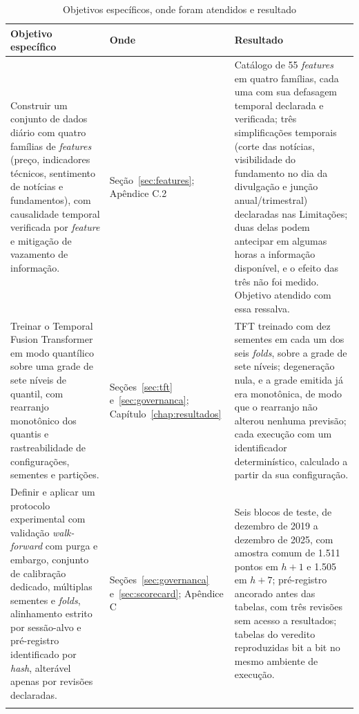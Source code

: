 \begin{table}[htbp]
\centering
\caption{Objetivos específicos, onde foram atendidos e resultado}
\label{tab:objetivos}
\footnotesize
\begin{tabular}{>{\raggedright\arraybackslash}p{5.6cm} >{\raggedright\arraybackslash}p{2.3cm} >{\raggedright\arraybackslash}p{6.4cm}}
\toprule
Objetivo específico & Onde & Resultado \\
\midrule
Construir um conjunto de dados diário com quatro famílias de \textit{features} (preço, indicadores técnicos, sentimento de notícias e fundamentos), com causalidade temporal verificada por \textit{feature} e mitigação de vazamento de informação. & Seção~\ref{sec:features}; Apêndice C.2 & Catálogo de 55 \textit{features} em quatro famílias, cada uma com sua defasagem temporal declarada e verificada; três simplificações temporais (corte das notícias, visibilidade do fundamento no dia da divulgação e junção anual/trimestral) declaradas nas Limitações; duas delas podem antecipar em algumas horas a informação disponível, e o efeito das três não foi medido. Objetivo atendido com essa ressalva. \\
\addlinespace
Treinar o Temporal Fusion Transformer em modo quantílico sobre uma grade de sete níveis de quantil, com rearranjo monotônico dos quantis e rastreabilidade de configurações, sementes e partições. & Seções~\ref{sec:tft} e~\ref{sec:governanca}; Capítulo~\ref{chap:resultados} & TFT treinado com dez sementes em cada um dos seis \textit{folds}, sobre a grade de sete níveis; degeneração nula, e a grade emitida já era monotônica, de modo que o rearranjo não alterou nenhuma previsão; cada execução com um identificador determinístico, calculado a partir da sua configuração. \\
\addlinespace
Definir e aplicar um protocolo experimental com validação \textit{walk-forward} com purga e embargo, conjunto de calibração dedicado, múltiplas sementes e \textit{folds}, alinhamento estrito por sessão-alvo e pré-registro identificado por \textit{hash}, alterável apenas por revisões declaradas. & Seções~\ref{sec:governanca} e~\ref{sec:scorecard}; Apêndice C & Seis blocos de teste, de dezembro de 2019 a dezembro de 2025, com amostra comum de 1.511 pontos em \(h+1\) e 1.505 em \(h+7\); pré-registro ancorado antes das tabelas, com três revisões sem acesso a resultados; tabelas do veredito reproduzidas bit a bit no mesmo ambiente de execução. \\
\addlinespace

\end{tabular}
\end{table}
